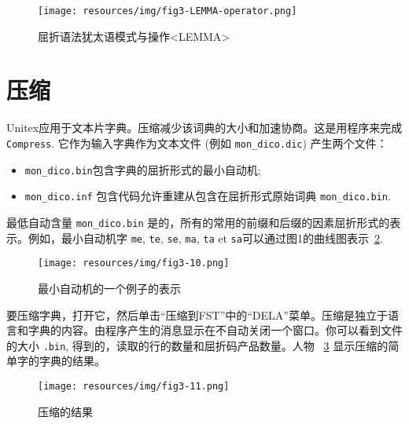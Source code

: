 \begin{figure}[!ht]
\begin{center}
\texttt{[image: resources/img/fig3-LEMMA-operator.png]}
\caption{屈折语法犹太语模式与操作<LEMMA>\label{LEMMA-operator}}
\end{center}
\end{figure}

\section{压缩}

Unitex应用于文本片字典。压缩减少该词典的大小和加速协商。这是用程序来完成 \verb+Compress+. 
它作为输入字典作为文本文件 (例如
	\verb+mon_dico.dic+) 产生两个文件：

\begin{itemize}
  \item \verb+mon_dico.bin+包含字典的屈折形式的最小自动机;
  \item \verb+mon_dico.inf+ 包含代码允许重建从包含在屈折形式原始词典 \verb+mon_dico.bin+.
\end{itemize}

\noindent 最低自动含量 \verb+mon_dico.bin+ 是的，所有的常用的前缀和后缀的因素屈折形式的表示。例如，最小自动机字 \verb+me+, \verb+te+, \verb+se+,
\verb+ma+, \verb+ta+ et \verb+sa+可以通过图1的曲线图表示~\ref{fig-example-minimal-automaton}.
\bigskip \begin{figure}[!h]
\begin{center}
\texttt{[image: resources/img/fig3-10.png]}
\caption{最小自动机的一个例子的表示\label{fig-example-minimal-automaton}}
\end{center}
\end{figure}

\noindent 要压缩字典，打开它，然后单击“压缩到FST”中的“DELA”菜单。压缩是独立于语言和字典的内容。由程序产生的消息显示在不自动关闭一个窗口。你可以看到文件的大小
\verb+.bin+, 得到的，读取的行的数量和屈折码产品数量。人物 ~\ref{fig-compression-result} 显示压缩的简单字的字典的结果。

\bigskip
\begin{figure}[!h]
\begin{center}
\texttt{[image: resources/img/fig3-11.png]}
\caption{压缩的结果\label{fig-compression-result}}
\end{center}
\end{figure}

